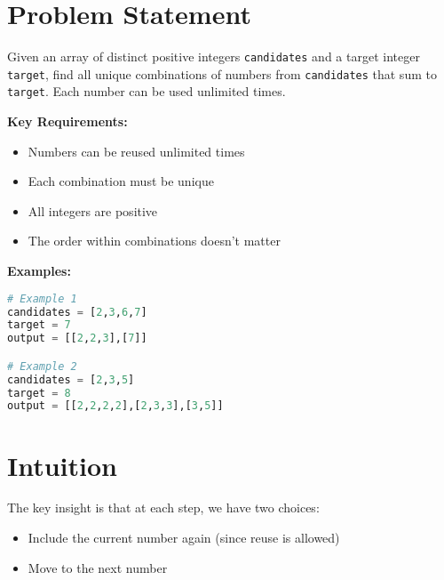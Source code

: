 
\label{problem:combination_sum}

\section*{Problem Statement}
Given an array of distinct positive integers \texttt{candidates} and a target integer \texttt{target}, find all unique combinations of numbers from \texttt{candidates} that sum to \texttt{target}. Each number can be used unlimited times.

\textbf{Key Requirements:}
\begin{itemize}
    \item Numbers can be reused unlimited times
    \item Each combination must be unique
    \item All integers are positive
    \item The order within combinations doesn't matter
\end{itemize}

\textbf{Examples:}
\begin{lstlisting}[language=Python]
# Example 1
candidates = [2,3,6,7]
target = 7
output = [[2,2,3],[7]]

# Example 2
candidates = [2,3,5]
target = 8
output = [[2,2,2,2],[2,3,3],[3,5]]
\end{lstlisting}

\section*{Intuition}
The key insight is that at each step, we have two choices:
\begin{itemize}
    \item Include the current number again (since reuse is allowed)
    \item Move to the next number
\end{itemize}

